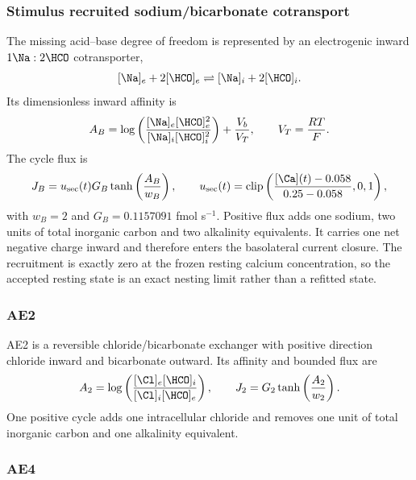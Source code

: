 \subsubsection{Stimulus recruited sodium/bicarbonate cotransport}

The missing acid--base degree of freedom is represented by an electrogenic inward $1\Na:2\HCO$ cotransporter,
\[
[\Na]_e+2[\HCO]_e\rightleftharpoons [\Na]_i+2[\HCO]_i.
\]
Its dimensionless inward affinity is
\begin{equation}
\label{eq:nbc-affinity}
A_B=\log\left(\frac{[\Na]_e[\HCO]_e^2}{[\Na]_i[\HCO]_i^2}\right)
+\frac{V_b}{V_T},
\qquad V_T=\frac{RT}{F}.
\end{equation}
The cycle flux is
\begin{equation}
\label{eq:nbc-flux}
J_B=u_{\mathrm{sec}}(t)G_B\tanh\left(\frac{A_B}{w_B}\right),
\qquad
u_{\mathrm{sec}}(t)=
\operatorname{clip}\left(\frac{[\Ca](t)-0.058}{0.25-0.058},0,1\right),
\end{equation}
with $w_B=2$ and $G_B=0.1157091$ fmol s$^{-1}$. Positive flux adds one sodium, two units of total inorganic carbon and two alkalinity equivalents. It carries one net negative charge inward and therefore enters the basolateral current closure. The recruitment is exactly zero at the frozen resting calcium concentration, so the accepted resting state is an exact nesting limit rather than a refitted state.

\subsubsection{AE2}

AE2 is a reversible chloride/bicarbonate exchanger with positive direction chloride inward and bicarbonate outward. Its affinity and bounded flux are
\begin{equation}
\label{eq:ae2}
A_2=\log\left(\frac{[\Cl]_e[\HCO]_i}{[\Cl]_i[\HCO]_e}\right),
\qquad
J_2=G_2\tanh\left(\frac{A_2}{w_2}\right).
\end{equation}
One positive cycle adds one intracellular chloride and removes one unit of total inorganic carbon and one alkalinity equivalent.

\subsubsection{AE4}

